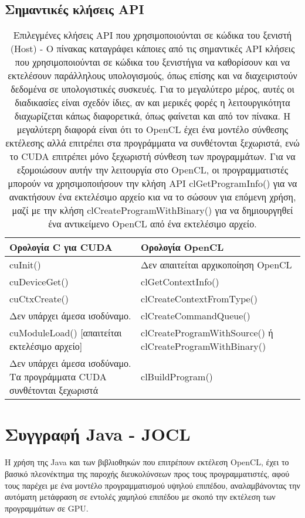 \subsection{Σημαντικές κλήσεις API}
\begin{table}[!htbp]
	\begin{tabular}{|p{8cm}|p{8cm}|}
	\hline 
	\rowcolor[HTML]{C0C0C0} 
	Ορολογία C για CUDA & Ορολογία OpenCL \\ \hline
	cuInit() & Δεν απαιτείται αρχικοποίηση OpenCL \\ \hline
	cuDeviceGet() & clGetContextInfo() \\ \hline
	cuCtxCreate() & clCreateContextFromType() \\ \hline
	Δεν υπάρχει άμεσα ισοδύναμο. & clCreateCommandQueue() \\ \hline
	cuModuleLoad() [απαιτείται εκτελέσιμο αρχείο] & clCreateProgramWithSource() ή clCreateProgramWithBinary() \\ \hline
	Δεν υπάρχει άμεσα ισοδύναμο. Τα προγράμματα CUDA συνθέτονται ξεχωριστά & clBuildProgram() \\ \hline
	\end{tabular}
	\caption{Επιλεγμένες κλήσεις API που χρησιμοποιούνται σε κώδικα του ξενιστή (Host) - Ο πίνακας καταγράφει κάποιες από τις σημαντικές API κλήσεις που χρησιμοποιούνται σε κώδικα του ξενιστήγια να καθορίσουν και να εκτελέσουν παράλληλους υπολογισμούς, όπως επίσης και να διαχειριστούν δεδομένα σε υπολογιστικές συσκευές. Για το μεγαλύτερο μέρος, αυτές οι διαδικασίες είναι σχεδόν ίδιες, αν και μερικές φορές η λειτουργικότητα διαχωρίζεται κάπως διαφορετικά, όπως φαίνεται και από τον πίνακα. Η μεγαλύτερη διαφορά είναι ότι το OpenCL έχει ένα μοντέλο σύνθεσης εκτέλεσης αλλά επιτρέπει στα προγράμματα να συνθέτονται ξεχωριστά, ενώ το CUDA επιτρέπει μόνο ξεχωριστή σύνθεση των προγραμμάτων. Για να εξομοιώσουν αυτήν την λειτουργία στο OpenCL, οι προγραμματιστές μπορούν να χρησιμοποιήσουν την κλήση API clGetProgramInfo() για να ανακτήσουν ένα εκτελέσιμο αρχείο κια να το σώσουν για επόμενη χρήση, μαζί με την κλήση clCreateProgramWithBinary() για να δημιουργηθεί ένα αντικείμενο OpenCL από ένα εκτελέσιμο αρχείο. }
\end{table}

\section{Συγγραφή Java - JOCL}
H χρήση της Java και των βιβλιοθηκών που επιτρέπουν εκτέλεση OpenCL, έχει το βασικό πλεονέκτημα της παροχής διευκολύνσεων προς τους προγραμματιστές, αφού τους παρέχει με ένα μοντέλο προγραμματισμού υψηλού επιπέδου, αναλαμβάνοντας την αυτόματη μετάφραση σε εντολές χαμηλού επιπέδου με σκοπό την εκτέλεση των προγραμμάτων σε GPU.

